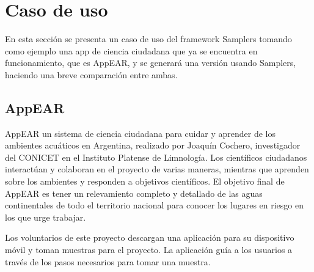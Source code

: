 \chapter{Caso de uso}\label{cap:caso_de_uso}

En esta sección se presenta un caso de uso del framework Samplers tomando como ejemplo una app de ciencia ciudadana que ya se encuentra en funcionamiento, que es AppEAR, y se generará una versión usando Samplers, haciendo una breve comparación entre ambas.

\section{AppEAR}
AppEAR un sistema de ciencia ciudadana para cuidar y aprender de los ambientes acuáticos en Argentina, realizado por Joaquín Cochero, investigador del CONICET en el Instituto Platense de Limnología. Los científicos ciudadanos interactúan y colaboran en el proyecto de varias maneras, mientras que aprenden sobre los ambientes y responden a objetivos científicos. El objetivo final de AppEAR es tener un relevamiento completo y detallado de las aguas continentales de todo el territorio nacional para conocer los lugares en riesgo en los que urge trabajar. 

Los voluntarios de este proyecto descargan una aplicación para su dispositivo móvil y toman muestras para el proyecto. La aplicación guía a los usuarios a través de los pasos necesarios para tomar una muestra.\cite{appEar}

